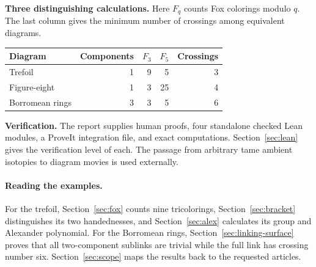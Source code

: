 \documentclass[11pt,letterpaper]{article}
\theoremstyle{definition}\newtheorem{definition}[theorem]{Definition}
\theoremstyle{remark}\newtheorem{remark}[theorem]{Remark}
\begin{document}
\vspace{.4em}
\noindent\textbf{Three distinguishing calculations.}
Here $F_q$ counts Fox colorings modulo $q$. The last column gives the minimum number of crossings among equivalent diagrams.
\begin{center}
\renewcommand{\arraystretch}{1.18}
\begin{tabular*}{0.94\linewidth}{@{\extracolsep{\fill}}lrrrr@{}}
\toprule Diagram & Components & $F_3$ & $F_5$ & Crossings\\\midrule
Trefoil & 1 & 9 & 5 & 3\\
Figure-eight & 1 & 3 & 25 & 4\\
Borromean rings & 3 & 3 & 5 & 6\\\bottomrule
\end{tabular*}
\end{center}
\vfill
{\noindent\small\textbf{Verification.} The report supplies human proofs, four standalone checked Lean modules, a ProveIt integration file, and exact computations. Section~\ref{sec:lean} gives the verification level of each. The passage from arbitrary tame ambient isotopies to diagram movies is used externally.\par}
\newpage
\tableofcontents
\vspace{1em}
\paragraph{Reading the examples.}
For the trefoil, Section~\ref{sec:fox} counts nine tricolorings, Section~\ref{sec:bracket} distinguishes its two handednesses, and Section~\ref{sec:alex} calculates its group and Alexander polynomial. For the Borromean rings, Section~\ref{sec:linking-surface} proves that all two-component sublinks are trivial while the full link has crossing number six. Section~\ref{sec:scope} maps the results back to the requested articles.
\newpage












\end{document}
